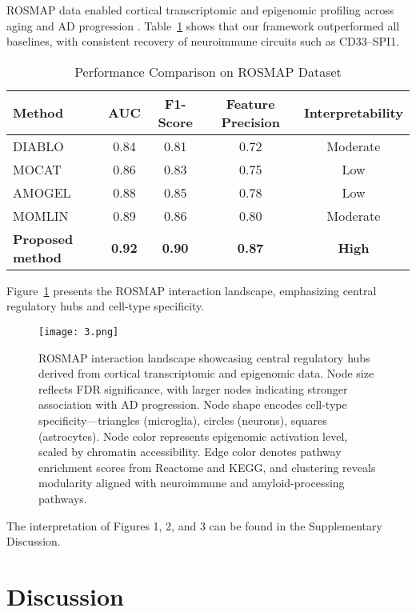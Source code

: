 \documentclass[12pt]{article}
\begin{document}
ROSMAP data enabled cortical transcriptomic and epigenomic profiling across aging and AD progression \citep{rosmap2024frontiers, mostafavi2018molecular, de2019integrative}. Table~\ref{tab:rosmap_comparison} shows that our framework outperformed all baselines, with consistent recovery of neuroimmune circuits such as CD33–SPI1.

\begin{table}[H]
\centering
\caption{Performance Comparison on ROSMAP Dataset}
\begin{tabular}{lcccc}
\toprule
\textbf{Method} & \textbf{AUC} & \textbf{F1-Score} & \textbf{Feature Precision} & \textbf{Interpretability} \\
\midrule
DIABLO & 0.84 & 0.81 & 0.72 & Moderate \\
MOCAT & 0.86 & 0.83 & 0.75 & Low \\
AMOGEL & 0.88 & 0.85 & 0.78 & Low \\
MOMLIN & 0.89 & 0.86 & 0.80 & Moderate \\
\textbf{Proposed method} & \textbf{0.92} & \textbf{0.90} & \textbf{0.87} & \textbf{High} \\
\bottomrule
\end{tabular}
\label{tab:rosmap_comparison}
\end{table}

Figure~\ref{fig:rosmap_gene_map} presents the ROSMAP interaction landscape, emphasizing central regulatory hubs and cell-type specificity.

\begin{figure}[H]
\centering
\texttt{[image: 3.png]}
\caption{ROSMAP interaction landscape showcasing central regulatory hubs derived from cortical transcriptomic and epigenomic data. Node size reflects FDR significance, with larger nodes indicating stronger association with AD progression. Node shape encodes cell-type specificity—triangles (microglia), circles (neurons), squares (astrocytes). Node color represents epigenomic activation level, scaled by chromatin accessibility. Edge color denotes pathway enrichment scores from Reactome and KEGG, and clustering reveals modularity aligned with neuroimmune and amyloid-processing pathways.}
\label{fig:rosmap_gene_map}
\end{figure}
The interpretation of Figures 1, 2, and 3 can be found in the Supplementary Discussion.

\section{Discussion}
\end{document}
